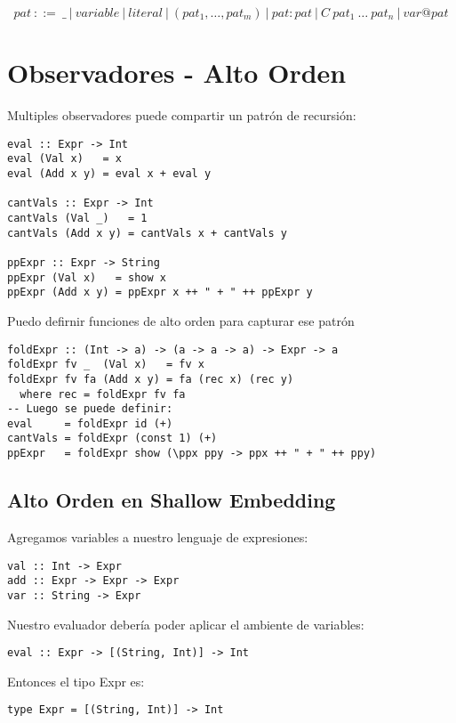 \documentclass{article}
\begin{document}
\[pat~::= ~\_ ~|~variable~|~literal~|~(pat_1, \ldots, pat_m)~|~pat:pat~|~C~pat_1~\ldots~pat_n~|~var@pat\]
          
\section{Observadores - Alto Orden}\label{sec:observadores_alto_orden}

\noindent Multiples observadores puede compartir un patrón de recursión:
\begin{lstlisting}
eval :: Expr -> Int
eval (Val x)   = x
eval (Add x y) = eval x + eval y

cantVals :: Expr -> Int
cantVals (Val _)   = 1
cantVals (Add x y) = cantVals x + cantVals y

ppExpr :: Expr -> String
ppExpr (Val x)   = show x
ppExpr (Add x y) = ppExpr x ++ " + " ++ ppExpr y

\end{lstlisting}

Puedo defirnir funciones de alto orden para capturar ese patrón
\begin{lstlisting}
foldExpr :: (Int -> a) -> (a -> a -> a) -> Expr -> a
foldExpr fv _  (Val x)   = fv x
foldExpr fv fa (Add x y) = fa (rec x) (rec y)
  where rec = foldExpr fv fa
-- Luego se puede definir:
eval     = foldExpr id (+)
cantVals = foldExpr (const 1) (+)
ppExpr   = foldExpr show (\ppx ppy -> ppx ++ " + " ++ ppy)
\end{lstlisting}

\subsection{Alto Orden en Shallow Embedding}\label{subsec:alto_orden_shallow_embedding}

Agregamos variables a nuestro lenguaje de expresiones:

\begin{lstlisting}
val :: Int -> Expr
add :: Expr -> Expr -> Expr
var :: String -> Expr
\end{lstlisting}  

Nuestro evaluador debería poder aplicar el ambiente de variables:

\begin{lstlisting}
eval :: Expr -> [(String, Int)] -> Int
\end{lstlisting}

Entonces el tipo Expr es:

\begin{lstlisting}
type Expr = [(String, Int)] -> Int
\end{lstlisting}
\end{document}
